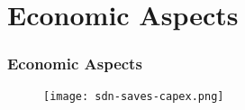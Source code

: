 \section{Economic Aspects}

\begin{frame}
\frametitle{Economic Aspects}

\begin{center}
  \begin{figure}
    \texttt{[image: sdn-saves-capex.png]}
  \end{figure}
\end{center}

\end{frame}

